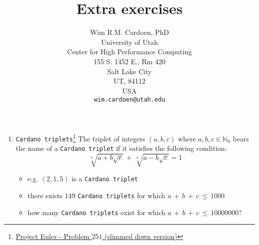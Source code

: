 \documentclass[10pt]{article}
\begin{document}
\title{Extra exercises}
\author{Wim R.M. Cardoen, PhD\\
        University of Utah\\
        Center for High Performance Computing\\
        155 S. 1452 E., Rm 420\\
        Salt Lake City\\
        UT, 84112\\
        USA\\
	\texttt{wim.cardoen@utah.edu}}
\renewcommand{\today}{February 18, 2024}
\renewcommand{\labelitemii}{$\star$}
\maketitle

\begin{enumerate}
	\item \texttt{Cardano triplets}\footnote{\href{https://www.projecteuler.net/problem=251}{Project Euler - Problem $251$ (slimmed down version)}}\newline
  	 The triplet of integers $(a,b,c)$ where $a,b,c \in \mathbb{N}_0$ bears the name 
         of a \texttt{Cardano triplet} if it satisfies the following condition:
  	 \begin{equation}
  	    \displaystyle \sqrt[3]{a+b\sqrt{c}}\,+\, \sqrt[3]{a-b\sqrt{c}}   =   1 \nonumber
	 \end{equation}		
         \begin{itemize}
            \item e.g. $(2,1,5)$ is a \texttt{Cardano triplet}
            \item there exists $149$ \texttt{Cardano triplets} for which $a\,+\,b\,+\,c\,\le\,1000$
            \item how many \texttt{Cardano triplets} exist for which $a\,+\,b\,+\,c\,\le\,10000000$?
         \end{itemize}			 
\end{enumerate}
\renewcommand \thesection{\Roman{section}}
\end{document}
